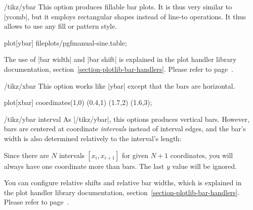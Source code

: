 \begin{key}{/tikz/ybar}
    This option produces fillable bar plots. It is thus very similar to
    |ycomb|, but it employs rectangular shapes instead of line-to operations.
    It thus allows to use any fill or pattern style.
\begin{codeexample}[]
\tikz\draw[draw=blue,fill=blue!60!black] plot[ybar] file{plots/pgfmanual-sine.table};
\end{codeexample}

\begin{codeexample}[]
\end{codeexample}
    The use of |bar width| and |bar shift| is explained in the plot handler
    library documentation, section~\ref{section-plotlib-bar-handlers}. Please
    refer to page~\pageref{key-bar-width}.
\end{key}

\begin{key}{/tikz/xbar}
    This option works like |ybar| except that the bars are horizontal.
\begin{codeexample}[]
\tikz \draw[pattern=north west lines] plot[xbar]
   coordinates{(1,0) (0.4,1) (1.7,2) (1.6,3)};
\end{codeexample}
\end{key}

\begin{key}{/tikz/ybar interval}
    As |/tikz/ybar|, this options produces vertical bars. However, bars are
    centered at coordinate \emph{intervals} instead of interval edges, and the
    bar's width is also determined relatively to the interval's length:
\begin{codeexample}[]
\end{codeexample}
    Since there are $N$ intervals $[x_i,x_{i+1}]$ for given $N+1$ coordinates,
    you will always have one coordinate more than bars. The last $y$ value will
    be ignored.

    You can configure relative shifts and relative bar widths, which is
    explained in the plot handler library documentation,
    section~\ref{section-plotlib-bar-handlers}. Please refer to
    page~\pageref{key-bar-interval-width}.
\end{key}


